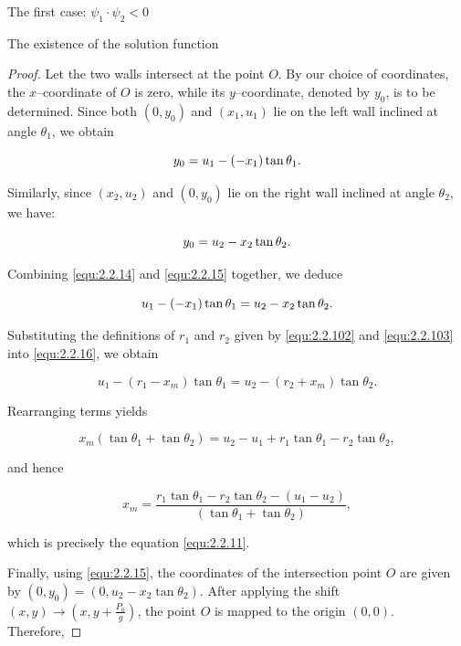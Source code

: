 \documentclass[letterpaper,reqno,10pt,twoside]{amsart}
\theoremstyle{definition}
\theoremstyle{remark}
\begin{document}
\begin{section}{The first case: $\psi_1\cdot \psi_2<0$ }
\begin{subsection}{The existence of the solution function}
\begin{proof}
         Let the two walls intersect at the point $O$. By our choice of coordinates, the $x$–coordinate of $O$ is zero, while its $y$–coordinate, denoted by $y_{0}$, is to be determined. Since both $(0,y_{0})$ and $(x_{1},u_{1})$ lie on the left wall inclined at angle $\theta_{1}$, we obtain

        \begin{equation}{\label{equ:2.2.14}}
        y_0=u_1-(-x_1)\tan\theta_1.
        \end{equation}

        \noindent Similarly, since $(x_2,u_2)$ and $(0,y_0)$ lie on the right wall inclined at angle $\theta_2$, we have:
        
        \begin{equation}{\label{equ:2.2.15}}
          y_0=u_2-x_2\tan\theta_2.
        \end{equation}

        Combining \eqref{equ:2.2.14} and \eqref{equ:2.2.15} together, we deduce

        \begin{equation}{\label{equ:2.2.16}}
            u_1-(-x_1)\tan\theta_1=u_2-x_{2}\tan\theta_2.
        \end{equation}

        \noindent  Substituting the definitions of $r_{1}$ and $r_{2}$ given by \eqref{equ:2.2.102} and \eqref{equ:2.2.103} into \eqref{equ:2.2.16}, we obtain

        \begin{equation*}
            u_1-(r_1-x_m)\tan\theta_1=u_2-(r_2+x_m)\tan\theta_2.
        \end{equation*}

        \noindent Rearranging terms yields
        
        \begin{equation*}
            x_{m}(\tan\theta_1+\tan\theta_2)=u_2-u_1+r_1\tan\theta_1-r_{2}\tan\theta_2,
        \end{equation*}

        \noindent and hence

        \begin{equation*}
            x_{m}=\frac{r_1\tan\theta_1-r_{2}\tan\theta_2-(u_1-u_2)}{(\tan\theta_1+\tan\theta_2)},
        \end{equation*}

        \noindent which is precisely the equation \eqref{equ:2.2.11}.

        Finally, using \eqref{equ:2.2.15}, the coordinates of the intersection point $O$ are given by $(0,y_0)=(0,u_2-x_{2}\tan\theta_2)$. After applying the shift $(x,y)\rightarrow (x,y+\frac{P_{0}}{g})$, the point $O$ is mapped to the origin $(0,0)$. Therefore, 


\end{proof}
\end{subsection}
\end{section}
\end{document}
